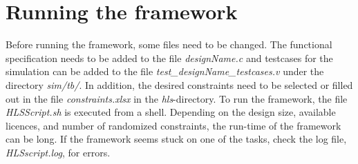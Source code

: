\section{\label{sec:runframework}Running the framework}
Before running the framework, some files need to be changed. The functional specification needs to be added to the file \textit{designName.c} and testcases for the simulation can be added to the file \textit{test\_designName\_testcases.v} under the directory \textit{sim/tb/}. In addition, the desired constraints need to be selected or filled out in the file \textit{constraints.xlsx} in the \textit{hls}-directory. To run the framework, the file \textit{HLSScript.sh} is executed from a shell. Depending on the design size, available licences, and number of randomized constraints, the run-time of the framework can be long. If the framework seems stuck on one of the tasks, check the log file, \textit{HLSscript.log}, for errors.

